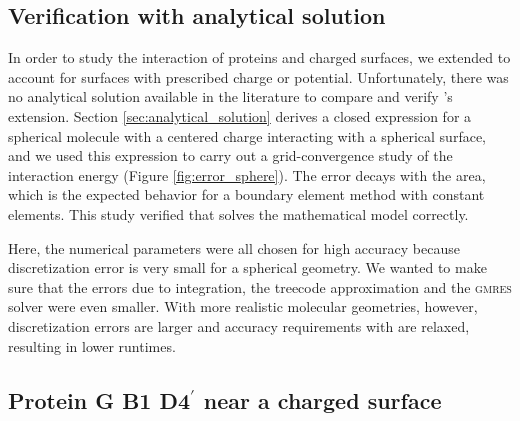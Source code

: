 
\subsection{Verification with analytical solution} \label{sec:disc_analytical}
In order to study the interaction of proteins and charged surfaces, we extended \pygbe to account for surfaces with prescribed charge or potential. Unfortunately, there was no analytical solution available in the literature to compare and verify \pygbe's extension. Section \ref{sec:analytical_solution} derives a closed expression for a spherical molecule with a centered charge interacting with a spherical surface, and we used this expression to carry out a grid-convergence study of the interaction energy (Figure \ref{fig:error_sphere}). The error decays with the area, which is the expected behavior \cite{CooperBardhanBarba2013, CooperBarba-share154331} for a boundary element method with constant elements. This study verified that \pygbe solves the mathematical model correctly.

Here, the numerical parameters were all chosen for high accuracy because  discretization error is very small for a spherical geometry. We wanted to make sure that the errors due to integration, the treecode approximation and the \textsc{gmres} solver were even smaller. With more realistic molecular geometries, however, discretization errors are larger and accuracy requirements with \pygbe are relaxed, resulting in lower runtimes.

\subsection{Protein G B1 D4$^\prime$ near a charged surface} \label{sec:disc_1PGB}


